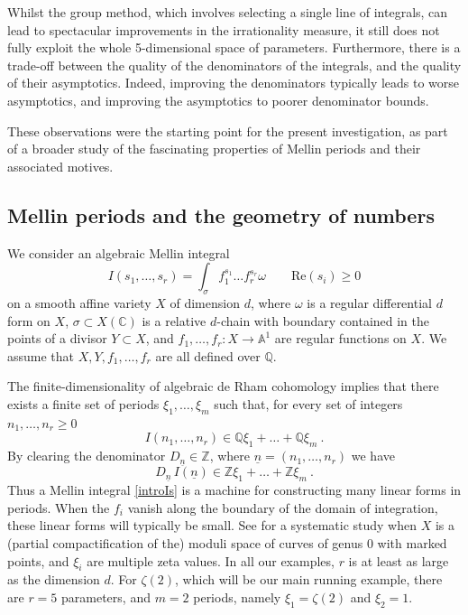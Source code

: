 \documentclass[a4paper,10pt]{amsart}
\theoremstyle{definition}
\theoremstyle{remark}
\numberwithin{equation}{section}
\newcommand{\Z}{\mathbb Z}
\newcommand{\Q}{\mathbb Q}
\newcommand{\C}{\mathbb C}
\newcommand{\0}{\color{blue}{\mathsf{0}}}
\begin{document}
Whilst  the group method, which involves selecting a single line of integrals, can lead to spectacular improvements in the irrationality measure, it still does not fully exploit the whole 5-dimensional space of parameters. Furthermore, there is a trade-off between the quality of the denominators of the integrals, and the quality of their asymptotics. Indeed, improving the denominators typically leads to worse asymptotics, and improving the asymptotics to poorer denominator bounds. 

These observations were the starting point for the present investigation, as part of a broader  study of the fascinating  properties of Mellin periods and their associated motives. 

\subsection{Mellin periods and the geometry of numbers}
 We consider an algebraic Mellin integral
\begin{equation}\label{introIs}   I(s_1,\ldots, s_r) = \int_{\sigma} f_1^{s_1} \ldots f_r^{s_r} \omega \qquad \mathrm{Re}(s_i)\geq 0
\end{equation}
on a smooth affine variety $X$ of dimension $d$, where  $\omega$ is a regular differential $d$ form on $X$, 
 $\sigma \subset X(\C)$ is a relative  $d$-chain with boundary  contained in  the points of a divisor  $Y\subset X$, and $f_1,\ldots, f_r: X \rightarrow \mathbb{A}^1$
are regular functions on $X$.
We assume that $X,Y, f_1,\ldots, f_r$ are all defined over $\Q$.

The finite-dimensionality of algebraic de Rham cohomology implies that there exists a finite set of periods $\xi_1,\ldots, \xi_m$ such that, for every set of integers $n_1,\ldots, n_r\geq 0$ 
\begin{equation} \label{introIns}  I(n_1,\ldots, n_r)  \in \Q \xi_1 + \ldots + \Q \xi_m\ .
\end{equation} 
By clearing the  denominator $D_{\underline{n}} \in \Z $, where $\underline{n} = (n_1,\ldots, n_r)$  we have 
\[  D_{\underline{n}}  \,   I(\underline{n}) \in  \Z \xi_1 + \ldots + \Z \xi_m\ .\]
Thus a  Mellin integral  \eqref{introIs}  is  a machine for constructing many linear forms in periods. When the $f_i$ vanish along the boundary of the domain of integration, these linear forms will typically be small. 
See \cite{DinnerParties} for a systematic study when $X$ is a (partial compactification of the) moduli space of curves of genus $0$ with  marked points, and $\xi_i$ are multiple zeta values.  In all our examples, $r$ is at least as large as the dimension $d$. For $\zeta(2)$, which will be our main running example, there are $r=5$ parameters, and $m=2$ periods, namely $\xi_1=\zeta(2)$ and $\xi_2=1$. 
\\
\end{document}
